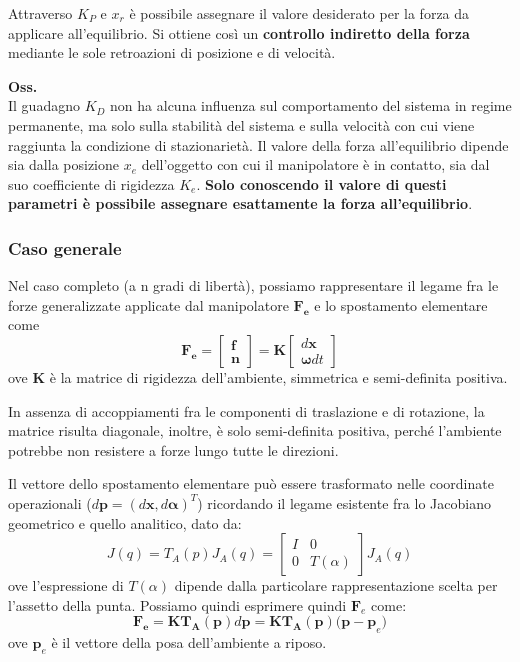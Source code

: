 Attraverso $K_P$ e $x_r$ è possibile assegnare il valore desiderato per la forza da applicare all’equilibrio. Si ottiene così un \textbf{controllo indiretto della forza} mediante le sole retroazioni di posizione e di velocità.

\textbf{Oss.}\\
Il guadagno $K_D$ non ha alcuna influenza sul comportamento del sistema in regime permanente, ma solo sulla stabilità del sistema e sulla velocità con cui viene raggiunta la condizione di stazionarietà. Il valore della forza all’equilibrio dipende sia dalla posizione $x_e$ dell’oggetto con cui il manipolatore è in contatto, sia dal suo coefficiente di rigidezza $K_e$. \textbf{Solo conoscendo il valore di questi parametri è possibile assegnare esattamente la forza all’equilibrio}.


\vspace*{10pt}
\subsubsection{Caso generale}
Nel caso completo (a n gradi di libertà), possiamo rappresentare il legame fra le forze generalizzate applicate dal manipolatore $\mathbf{F_e}$ e lo spostamento elementare come
$$
\mathbf{F_e} = \begin{bmatrix}\mathbf{f} \\ \mathbf{n}\end{bmatrix} = \mathbf{K}\begin{bmatrix}d\mathbf{x} \\ \boldsymbol{\omega}dt\end{bmatrix}
$$
ove $\mathbf{K}$ è la matrice di rigidezza dell’ambiente, simmetrica e semi-definita positiva.

In assenza di accoppiamenti fra le componenti di traslazione e di rotazione, la matrice risulta diagonale, inoltre, è solo semi-definita positiva, perché l’ambiente potrebbe non resistere a forze lungo tutte le direzioni.

Il vettore dello spostamento elementare può essere trasformato nelle coordinate operazionali ($d\mathbf{p} = (d\mathbf{x}, d\boldsymbol{\alpha})^T$) ricordando il legame esistente fra lo Jacobiano geometrico e quello analitico, dato da:
\boldmath
\begin{equation}\label{eq:jac_an_jac_rel}
J(q) = T_A(p)J_A(q) = 
\begin{bmatrix}I & 0 \\ 0 & T(\alpha)\end{bmatrix}J_A(q)
\end{equation}
\unboldmath
ove l’espressione di $T(\alpha)$ dipende dalla particolare rappresentazione scelta per l’assetto della punta. Possiamo quindi esprimere quindi $\mathbf{F}_e$ come:
\begin{equation}\label{eq:fe_def}
\boldsymbol{F_e} = \boldsymbol{KT_A(p)}d\boldsymbol{p} = \boldsymbol{KT_A(p)(p - p}_e)
\end{equation}
ove $\mathbf{p}_e$ è il vettore della posa dell’ambiente a riposo.

